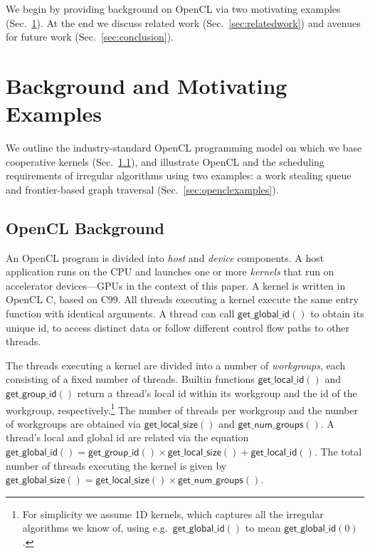 \documentclass[numbers,nocopyrightspace,10pt]{sigplanconf}
\newcommand{\mysec}{Sec.~}
\newcommand{\getgroupid}{\mathsf{get\_group\_id}}
\newcommand{\getnumgroups}{\mathsf{get\_num\_groups}}
\newcommand{\getlocalid}{\mathsf{get\_local\_id}}
\newcommand{\getglobalid}{\mathsf{get\_global\_id}}
\newcommand{\getlocalsize}{\mathsf{get\_local\_size}}
\newcommand{\getglobalsize}{\mathsf{get\_global\_size}}
\begin{document}
We begin by providing background on OpenCL via two motivating examples (\mysec\ref{sec:background}).  At the end we discuss related work (\mysec\ref{sec:relatedwork}) and avenues for future work (\mysec\ref{sec:conclusion}).

\section{Background and Motivating Examples}\label{sec:background}

We outline the industry-standard OpenCL programming model on which we
base cooperative kernels (\mysec\ref{sec:opencl}), and illustrate
OpenCL and the scheduling requirements of irregular algorithms using two examples: a work stealing queue and frontier-based graph traversal
(\mysec\ref{sec:openclexamples}).

\subsection{OpenCL Background}\label{sec:opencl}



An OpenCL program is divided into \emph{host} and \emph{device}
components.  A host application runs on the CPU and launches one or
more \emph{kernels} that run on accelerator devices---GPUs in the
context of this paper.  A kernel is written in OpenCL C, based on C99.
All threads executing a kernel execute the same entry function with
identical arguments.  A thread can call $\getglobalid()$
to obtain its unique id, to access distinct data or follow different control flow paths to other threads.

The threads executing a kernel are divided into a number of \emph{workgroups}, each consisting of a fixed number of threads.  Builtin functions
$\getlocalid()$ and $\getgroupid()$ return a thread's local id within
its workgroup and the id of the workgroup, respectively.\footnote{For simplicity we assume 1D kernels, which captures all the
irregular algorithms we know of, using
e.g.\ $\getglobalid()$ to mean $\getglobalid(0)$.
}  The number
of threads per workgroup and the number of workgroups are obtained via
$\getlocalsize()$ and $\getnumgroups()$.  A thread's local and global
id are related via the equation $\getglobalid() = \getgroupid() \times
\getlocalsize() + \getlocalid()$.  The total number of threads executing the kernel is given by $\getglobalsize() = \getlocalsize()\times\getnumgroups()$.
\end{document}
